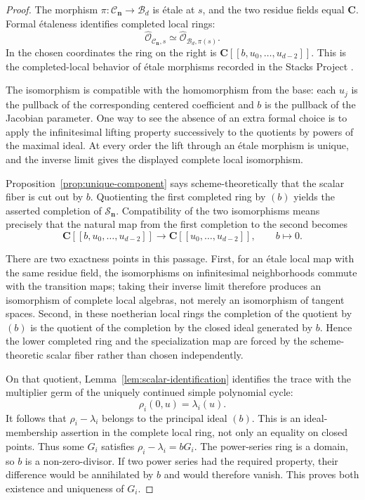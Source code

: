 \documentclass[11pt]{article}
\theoremstyle{definition}
\theoremstyle{remark}
\newcommand{\C}{\mathbf C}
\newcommand{\cB}{\mathcal B}
\newcommand{\cC}{\mathcal C}
\newcommand{\cS}{\mathcal S}
\newcommand{\bn}{\mathbf n}
\begin{document}
\begin{proof}
The morphism $\pi:\cC_{\bn}\to\cB_d$ is étale at $s$, and the two residue
fields equal $\C$.  Formal étaleness identifies completed local rings:
\[
  \widehat{\mathcal O}_{\cC_{\bn},s}
  \simeq
  \widehat{\mathcal O}_{\cB_d,\pi(s)}.
\]
In the chosen coordinates the ring on the right is
$\C[[b,u_0,\ldots,u_{d-2}]]$.  This is the completed-local behavior of
étale morphisms recorded in the Stacks Project
\cite[Tags 02GH and 0257]{StacksProject}.

The isomorphism is compatible with the homomorphism from the base: each
$u_j$ is the pullback of the corresponding centered coefficient and $b$ is
the pullback of the Jacobian parameter.  One way to see the absence of an
extra formal choice is to apply the infinitesimal lifting property
successively to the quotients by powers of the maximal ideal.  At every
order the lift through an étale morphism is unique, and the inverse limit
gives the displayed complete local isomorphism.

Proposition~\ref{prop:unique-component} says scheme-theoretically that the
scalar fiber is cut out by $b$.  Quotienting the first completed ring by
$(b)$ yields the asserted completion of $\cS_{\bn}$.  Compatibility of the
two isomorphisms means precisely that the natural map from the first
completion to the second becomes
\[
  \C[[b,u_0,\ldots,u_{d-2}]]
  \longrightarrow
  \C[[u_0,\ldots,u_{d-2}]],
  \qquad b\longmapsto0.
\]

There are two exactness points in this passage.  First, for an étale local
map with the same residue field, the isomorphisms on infinitesimal
neighborhoods commute with the transition maps; taking their inverse limit
therefore produces an isomorphism of complete local algebras, not merely an
isomorphism of tangent spaces.  Second, in these noetherian local rings the
completion of the quotient by $(b)$ is the quotient of the completion by
the closed ideal generated by $b$.  Hence the lower completed ring and the
specialization map are forced by the scheme-theoretic scalar fiber rather
than chosen independently.

On that quotient, Lemma~\ref{lem:scalar-identification} identifies the trace
with the multiplier germ of the uniquely continued simple polynomial cycle:
\[
  \rho_i(0,u)=\lambda_i(u).
\]
It follows that $\rho_i-\lambda_i$ belongs to the principal ideal $(b)$.
This is an ideal-membership assertion in the complete local ring, not only
an equality on closed points.  Thus some $G_i$ satisfies
$\rho_i-\lambda_i=bG_i$.  The power-series ring is a domain, so $b$ is a
non-zero-divisor.  If two power series had the required property, their
difference would be annihilated by $b$ and would therefore vanish.  This
proves both existence and uniqueness of $G_i$.
\end{proof}
\end{document}
